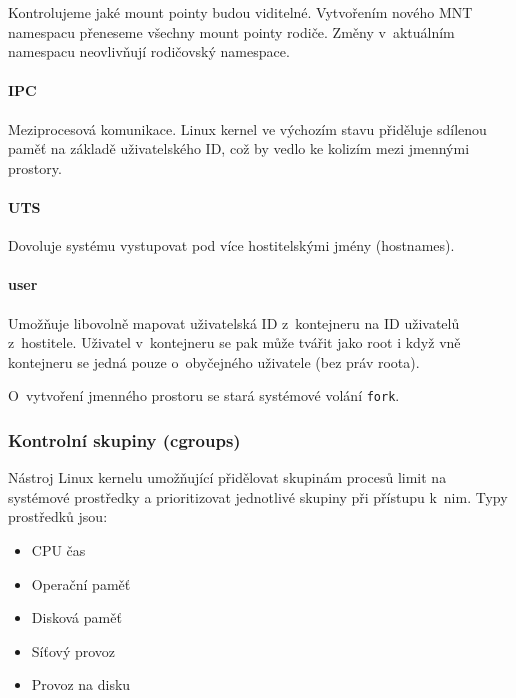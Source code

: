 Kontrolujeme jaké mount pointy budou viditelné.
Vytvořením nového MNT namespacu přeneseme všechny mount pointy rodiče.
Změny v~aktuálním namespacu neovlivňují rodičovský namespace.
\cite{mnt_namespaces}

\paragraph{IPC}

Meziprocesová komunikace.
Linux kernel ve výchozím stavu přiděluje sdílenou paměť na základě uživatelského ID, což by vedlo ke kolizím mezi jmennými prostory.
\cite{namespaces}


\paragraph{UTS}

Dovoluje systému vystupovat pod více hostitelskými jmény (hostnames).
\cite{namespaces}

\paragraph{user}

Umožňuje libovolně mapovat uživatelská ID z~kontejneru na ID uživatelů z~hostitele.
Uživatel v~kontejneru se pak může tvářit jako root i když vně kontejneru se jedná pouze o~obyčejného uživatele (bez práv roota).
\cite{user_namespaces}


O~vytvoření jmenného prostoru se stará systémové volání \verb|fork|.

\subsubsection{Kontrolní skupiny (cgroups)}

Nástroj Linux kernelu umožňující přidělovat skupinám procesů limit na systémové prostředky a prioritizovat jednotlivé skupiny při přístupu k~nim.
Typy prostředků jsou:
\begin{itemize}
	\item CPU čas
	\item Operační paměť
	\item Disková paměť
	\item Síťový provoz
	\item Provoz na disku
\end{itemize}

